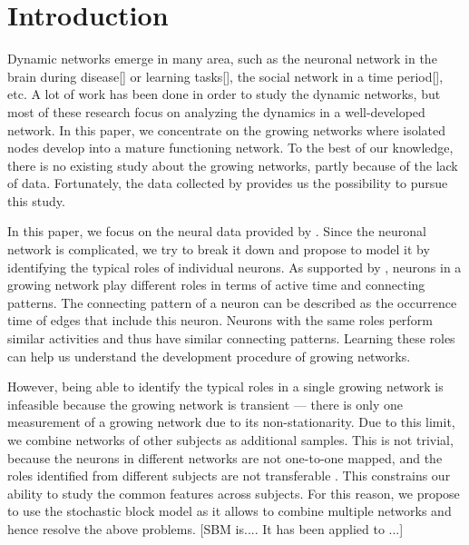 

\section{Introduction}

Dynamic networks emerge in many area,
such as the neuronal network in the brain during disease[] or learning tasks[], 
the social network in a time period[], etc.
A lot of work has been done in order to study the dynamic networks,
but most of these research focus on analyzing the dynamics in a well-developed network.
In this paper, we concentrate on the growing networks where isolated nodes  develop into a mature functioning network.
To the best of our knowledge, there is no existing study about the growing networks, partly because of the lack of data.
Fortunately, the data collected by \citet{Wan2019} provides us the possibility to pursue this study.


In this paper, we focus on the neural data provided by \cite{Wan2019}.
Since the neuronal network is complicated, we try to break it down and propose to model it by identifying the typical roles of individual neurons. 
As supported by \cite{Wan2019}, neurons in a growing network play different roles in terms of active time and connecting patterns. 
The connecting pattern of a neuron can be described as the occurrence time of edges that include this neuron. 
Neurons with the same roles perform similar activities and thus have similar connecting patterns. 
Learning these roles can help us understand the development procedure of growing networks.


However, being able to identify the typical roles in a single growing network is  infeasible because 
the growing network  is transient --- 
there is only one measurement of a growing network due to its non-stationarity.
Due to this limit, we combine networks of other subjects as additional samples.
This is not trivial, because the neurons in different networks are not one-to-one mapped, 
and the roles identified from different subjects are not transferable
. 
This constrains our ability to study the common features across subjects.
For this reason, we propose to use the stochastic block model as it allows to combine multiple networks and hence resolve the above problems.
[SBM is.... It has been applied to ...]


